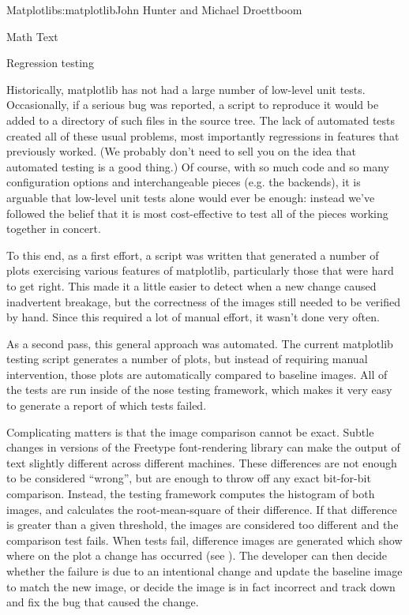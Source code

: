 \begin{aosachapter}{Matplotlib}{s:matplotlib}{John Hunter and Michael Droettboom}
\begin{aosasect1}{Math Text}
\end{aosasect1}

\begin{aosasect1}{Regression testing}

Historically, matplotlib has not had a large number of low-level
unit tests.  Occasionally, if a serious bug was reported, a script
to reproduce it would be added to a directory of such files in the
source tree.  The lack of automated tests created all of these usual
problems, most importantly regressions in features that previously
worked.  (We probably don't need to sell you on the idea that
automated testing is a good thing.)  Of course, with so much code
and so many configuration options and interchangeable pieces
(e.g. the backends), it is arguable that low-level unit tests alone
would ever be enough: instead we've followed the belief that it is
most cost-effective to test all of the pieces working together in
concert.

To this end, as a first effort, a script was written that generated a
number of plots exercising various features of matplotlib,
particularly those that were hard to get right.  This made it a little
easier to detect when a new change caused inadvertent breakage, but
the correctness of the images still needed to be verified by hand.
Since this required a lot of manual effort, it wasn't done very often.

As a second pass, this general approach was automated.  The current
matplotlib testing script generates a number of plots, but instead of
requiring manual intervention, those plots are automatically compared
to baseline images.  All of the tests are run inside of the nose
testing framework, which makes it very easy to generate a report of
which tests failed.

Complicating matters is that the image comparison cannot be exact.
Subtle changes in versions of the Freetype font-rendering library can
make the output of text slightly different across different machines.
These differences are not enough to be considered ``wrong'', but are
enough to throw off any exact bit-for-bit comparison.  Instead, the
testing framework computes the histogram of both images, and
calculates the root-mean-square of their difference.  If that
difference is greater than a given threshold, the images are
considered too different and the comparison test fails.  When tests
fail, difference images are generated which show where on the plot a
change has occurred (see ).  The
developer can then decide whether the failure is due to an intentional
change and update the baseline image to match the new image, or
decide the image is in fact incorrect and track down and fix the bug
that caused the change.


\end{aosasect1}
\end{aosachapter}
